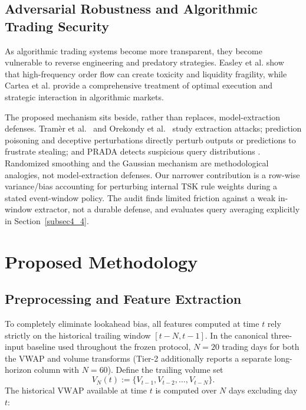 \documentclass[pdflatex,sn-mathphys-num]{sn-jnl}
\theoremstyle{thmstyleone}
\theoremstyle{thmstyletwo}
\theoremstyle{thmstylethree}
\begin{document}
\subsection{Adversarial Robustness and Algorithmic Trading Security}

As algorithmic trading systems become more transparent, they become vulnerable to reverse engineering and predatory strategies. Easley et al. \cite{easley2012} show that high-frequency order flow can create toxicity and liquidity fragility, while Cartea et al. \cite{cartea2015} provide a comprehensive treatment of optimal execution and strategic interaction in algorithmic markets.

The proposed mechanism sits beside, rather than replaces, model-extraction defenses. Tram{\`e}r et al.\ \cite{tramer2016} and Orekondy et al.\ \cite{orekondy2019} study extraction attacks; prediction poisoning \cite{orekondy2020} and deceptive perturbations \cite{lee2019} directly perturb outputs or predictions to frustrate stealing; and PRADA detects suspicious query distributions \cite{juuti2019}. Randomized smoothing \cite{cohen2019} and the Gaussian mechanism \cite{dwork2006} are methodological analogies, not model-extraction defenses. Our narrower contribution is a row-wise variance/bias accounting for perturbing internal TSK rule weights during a stated event-window policy. The audit finds limited friction against a weak in-window extractor, not a durable defense, and evaluates query averaging explicitly in Section~\ref{subsec4_4}.

\section{Proposed Methodology}\label{sec3}

\subsection{Preprocessing and Feature Extraction}\label{subsec3_1}

To completely eliminate lookahead bias, all features computed at time $t$ rely strictly on the historical trailing window $[t-N, t-1]$. In the canonical three-input baseline used throughout the frozen protocol, $N=20$ trading days for both the VWAP and volume transforms (Tier-2 additionally reports a separate long-horizon column with $N=60$). Define the trailing volume set
\[
V_N(t) := \{V_{t-1},V_{t-2},\ldots,V_{t-N}\}.
\]
The historical $\mathrm{VWAP}$ available at time $t$ is computed over $N$ days excluding day $t$:
\end{document}
